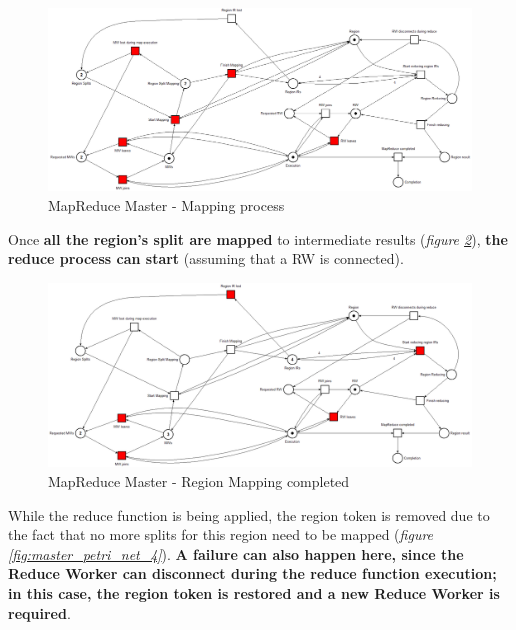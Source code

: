 \begin{figure}[!ht]
    \centering
    \includegraphics[width=\linewidth]{document/chapters/chapter_6/images/master_petri_net_2.png}
    \caption{MapReduce Master - Mapping process}
    \label{fig:master_petri_net_2}
\end{figure}

Once \textbf{all the region's split are mapped} to intermediate results (\textit{figure \ref{fig:master_petri_net_3}}), \textbf{the reduce process can start} (assuming that a RW is connected).

\begin{figure}[!ht]
    \centering
    \includegraphics[width=\linewidth]{document/chapters/chapter_6/images/master_petri_net_3.png}
    \caption{MapReduce Master - Region Mapping completed}
    \label{fig:master_petri_net_3}
\end{figure}

While the reduce function is being applied, the region token is removed due to the fact that no more splits for this region need to be mapped (\textit{figure \ref{fig:master_petri_net_4}}). \textbf{A failure can also happen here, since the Reduce Worker can disconnect during the reduce function execution; in this case, the region token is restored and a new Reduce Worker is required}.

\vspace{5mm}

